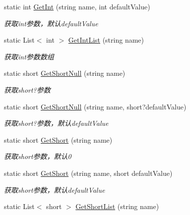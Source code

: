 \begin{DoxyCompactItemize}
static int \hyperlink{class_x_c_l_net_tools_1_1_string_hander_1_1_form_helper_ab1cbc4a5f6643c60beaf928081457b6f}{Get\-Int} (string name, int default\-Value)
\begin{DoxyCompactList}\small\item\em 获取int参数，默认default\-Value \end{DoxyCompactList}\item 
static List$<$ int $>$ \hyperlink{class_x_c_l_net_tools_1_1_string_hander_1_1_form_helper_a555eba05a8bdc2cab01e84b91e84f8c5}{Get\-Int\-List} (string name)
\begin{DoxyCompactList}\small\item\em 获取int参数数组 \end{DoxyCompactList}\item 
static short \hyperlink{class_x_c_l_net_tools_1_1_string_hander_1_1_form_helper_afe30b64436d0a1831330cd390f3f4b51}{Get\-Short\-Null} (string name)
\begin{DoxyCompactList}\small\item\em 获取short?参数 \end{DoxyCompactList}\item 
static short \hyperlink{class_x_c_l_net_tools_1_1_string_hander_1_1_form_helper_a23c16178ebaf6132bc6954dd098ed901}{Get\-Short\-Null} (string name, short?default\-Value)
\begin{DoxyCompactList}\small\item\em 获取short?参数，默认default\-Value \end{DoxyCompactList}\item 
static short \hyperlink{class_x_c_l_net_tools_1_1_string_hander_1_1_form_helper_a197c2283e3000030d40e7a50d10471f0}{Get\-Short} (string name)
\begin{DoxyCompactList}\small\item\em 获取short参数，默认0 \end{DoxyCompactList}\item 
static short \hyperlink{class_x_c_l_net_tools_1_1_string_hander_1_1_form_helper_a16b3f8a3141fb74656dc3c857da2099b}{Get\-Short} (string name, short default\-Value)
\begin{DoxyCompactList}\small\item\em 获取short参数，默认default\-Value \end{DoxyCompactList}\item 
static List$<$ short $>$ \hyperlink{class_x_c_l_net_tools_1_1_string_hander_1_1_form_helper_aa99502c5145f156f0e8b714d7ab4c308}{Get\-Short\-List} (string name)

\end{DoxyCompactItemize}
